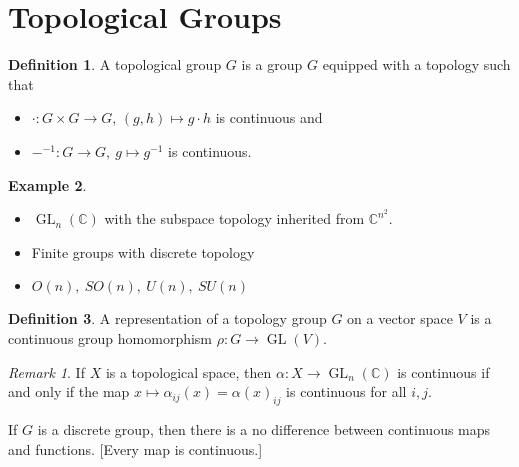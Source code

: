 \documentclass{article}
\theoremstyle{definition}
\newtheorem{defn}{Definition}[section]
\newtheorem{example}[defn]{Example}
\theoremstyle{remark}
\newtheorem{rem}{Remark}
\theoremstyle{plain}
\newcommand{\CC}{\mathbb{C}}
\begin{document}
\section{Topological Groups}
\begin{defn}
    A topological group $G$ is a group $G$ equipped with a topology such that 
    \begin{itemize}
        \item $\cdot: G\times G\to G$, $(g,h)\mapsto g\cdot h$ is continuous and
        \item $-^{-1}:G\to G,\ g\mapsto g^{-1}$ is continuous.
    \end{itemize}
\end{defn}
\begin{example}
\begin{itemize}
    \item $\operatorname{GL}_n(\CC)$ with the subspace topology inherited from $\CC^{n^2}$. 
    \item Finite groups with discrete topology
    \item $O(n),\ SO(n),\ U(n), \ SU(n)$
\end{itemize}
\end{example}
\begin{defn}
    A representation of a topology group $G$ on a vector space $V$ is a continuous group homomorphism $\rho:G\to\operatorname{GL}(V)$.
\end{defn}

\begin{rem}
    If $X$ is a topological space, then $\alpha:X\to\operatorname{GL}_n(\CC)$ is continuous if and only if the map $x\mapsto \alpha_{ij}(x)=\alpha(x)_{ij}$ is continuous for all $i,j$.

    If $G$ is a discrete group, then there is a no difference between continuous maps and functions. [Every map is continuous.]
\end{rem}
\end{document}
